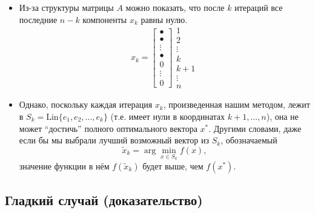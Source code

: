 \documentclass[
  russian,
  letterpaper,
  DIV=11,
  numbers=noendperiod]{scrartcl}
\providecommand{\tightlist}{%
  \setlength{\itemsep}{0pt}\setlength{\parskip}{0pt}}
\begin{document}
\begin{itemize}
\tightlist
\item
  Из-за структуры матрицы \(A\) можно показать, что после \(k\) итераций
  все последние \(n-k\) компоненты \(x_k\) равны нулю. \[
    x_{k} =
    \begin{bmatrix} 
        \bullet \\ 
        \bullet \\ 
        \vdots \\ 
        \bullet \\ 
        0 \\ 
        \vdots \\ 
        0 
    \end{bmatrix}
    \begin{array}{l}
        1 \\ 
        2 \\ 
        \vdots \\ 
        k \\ 
        k+1 \\ 
        \vdots \\ 
        n 
    \end{array}
    \]
\item
  Однако, поскольку каждая итерация \(x_k\), произведенная нашим
  методом, лежит в \(S_k = \text{Lin}\{e_1, e_2, \ldots, e_{k}\}\) (т.е.
  имеет нули в координатах \(k+1,\dots,n\)), она не может ``достичь''
  полного оптимального вектора \(x^*\). Другими словами, даже если бы мы
  выбрали лучший возможный вектор из \(S_k\), обозначаемый \[
  \tilde{x}_k=\arg\min_{x\in S_k} f(x),
  \] значение функции в нём \(f(\tilde{x}_k)\) будет выше, чем
  \(f(x^*)\).
\end{itemize}

\subsection{Гладкий случай
(доказательство)}\label{ux433ux43bux430ux434ux43aux438ux439-ux441ux43bux443ux447ux430ux439-ux434ux43eux43aux430ux437ux430ux442ux435ux43bux44cux441ux442ux432ux43e-1}
\end{document}
